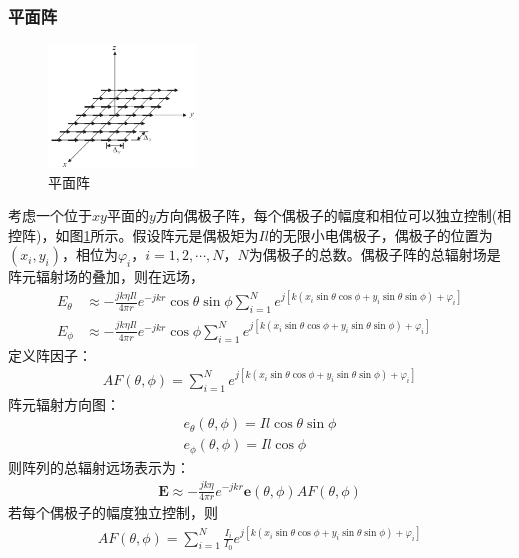 \documentclass{article}
\numberwithin{equation}{section}
\renewcommand{\vec}[1]{\boldsymbol{#1}}
\begin{document}
\subsubsection{平面阵}
\begin{figure}[ht]
    \centering
    \includegraphics[width=0.35\textwidth]{平面阵.PNG}
    \caption{平面阵}
    \label{fig:fig5}
\end{figure}
考虑一个位于$xy$平面的$y$方向偶极子阵，每个偶极子的幅度和相位可以独立控制(相控阵)，如图\ref{fig:fig5}所示。假设阵元是偶极矩为$Il$的无限小电偶极子，偶极子的位置为$(x_i,y_i)$，相位为$\varphi_i$，$i=1,2,\cdots,N$，$N$为偶极子的总数。偶极子阵的总辐射场是阵元辐射场的叠加，则在远场，
\begin{align}
    \label{eq:eq146}
    E_{\theta}&\approx-\frac{jk\eta Il}{4\pi r}e^{-jkr}\cos\theta\sin\phi\sum_{i=1}^{N}e^{j[k(x_i\sin\theta\cos\phi+y_i\sin\theta\sin\phi)+\varphi_i]} \\
    \label{eq:eq147}
    E_{\phi}&\approx-\frac{jk\eta Il}{4\pi r}e^{-jkr}\cos\phi\sum_{i=1}^{N}e^{j[k(x_i\sin\theta\cos\phi+y_i\sin\theta\sin\phi)+\varphi_i]}
\end{align}
定义阵因子：
\begin{align}
    \label{eq:eq148}
    AF(\theta,\phi)=\sum_{i=1}^{N}e^{j[k(x_i\sin\theta\cos\phi+y_i\sin\theta\sin\phi)+\varphi_i]}
\end{align}
阵元辐射方向图：
\begin{align}
    \label{eq:eq149}
    e_{\theta}(\theta,\phi)=Il\cos\theta\sin\phi \\
    \label{eq:eq150}
    e_{\phi}(\theta,\phi)=Il\cos\phi
\end{align}
则阵列的总辐射远场表示为：
\begin{align}
    \label{eq:eq151}
    \mathbf{E}\approx-\frac{jk\eta}{4\pi r}e^{-jkr}\vec{e}(\theta,\phi)AF(\theta,\phi)
\end{align}
若每个偶极子的幅度独立控制，则
\begin{align}
    \label{eq:eq152}
    AF(\theta,\phi)=\sum_{i=1}^{N}\frac{I_i}{I_0}e^{j[k(x_i\sin\theta\cos\phi+y_i\sin\theta\sin\phi)+\varphi_i]}
\end{align}
\end{document}
